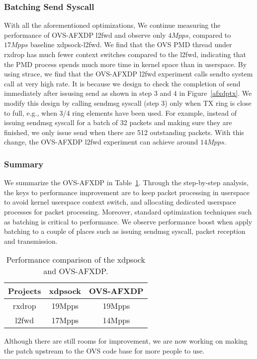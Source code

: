 \documentclass[10pt,numbers,reprint]{sigplanconf}
\begin{document}
\subsubsection{Batching Send Syscall}
With all the aforementioned optimizations, We continue measuring the
performance of OVS-AFXDP l2fwd and observe only $4Mpps$, compared to
$17Mpps$ baseline xdpsock-l2fwd.
We find that the OVS PMD thread under rxdrop has much fewer context
switches compared to the l2fwd, indicating that
the PMD process spends much more time in kernel space than in userspace.
By using strace, we find that the OVS-AFXDP l2fwd experiment calls sendto
system call at very high rate. It is because we design to check the
completion of send immediately after issusing send as shown in step 3 and
4 in Figure~\ref{afxdptx}.
We modify this design by calling sendmsg syscall (step 3) only when TX ring is
close to full, e.g., when 3/4 ring elements have been used.
For example, instead of issuing sendmsg syscall for a batch of 32 packets
and making sure they are finished, we only issue send when there are 512
outstanding packets.  With this change, the OVS-AFXDP l2fwd experiment
can achieve around $14Mpps$.

\subsubsection{Summary}
We summarize the OVS-AFXDP in Table~\ref{compare}.
Through the step-by-step analysis, the keys to performance improvement are to
keep packet processing in userspace to avoid kernel userspace context switch,
and allocating dedicated userspace processes for packet processing.
Moreover, standard optimization techniques such as batching is critical
to performance. We observe performance boost when apply batching to a couple
of places such as issuing sendmsg syscall, packet reception and transmission.
\begin{table}
\centering
\small
\begin{tabular}{|c | c | c|}
\hline
 {\bf Projects} & {\bf xdpsock } & {\bf OVS-AFXDP} \\ \hline\hline
  rxdrop & 19Mpps & 19Mpps \\ \hline
  l2fwd  & 17Mpps & 14Mpps \\ \hline
  \end{tabular}
\caption{\footnotesize
Performance comparison of the xdpsock and OVS-AFXDP.
}
\label{compare}
\end{table}

Although there are still rooms for improvement, we are now working on
making the patch upstream to the OVS code base for more people to use.
\end{document}
